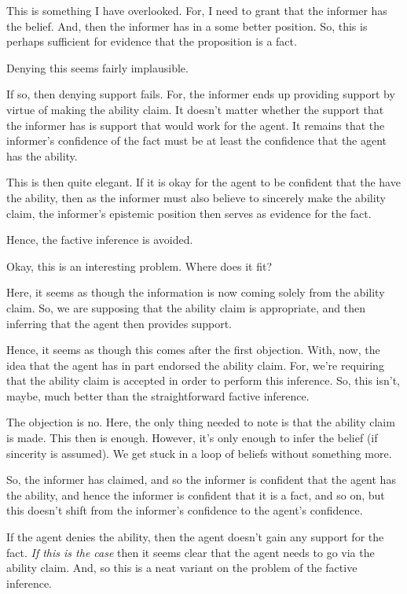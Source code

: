 \documentclass[10pt]{article}
\begin{document}
\begin{note}
  This is something I have overlooked.
  For, I need to grant that the informer has the belief.
  And, then the informer has in a some better position.
  So, this is perhaps sufficient for evidence that the proposition is a fact.

  Denying this seems fairly implausible.

  If so, then denying support fails.
  For, the informer ends up providing support by virtue of making the ability claim.
  It doesn't matter whether the support that the informer has is support that would work for the agent.
  It remains that the informer's confidence of the fact must be at least the confidence that the agent has the ability.

  This is then quite elegant.
  If it is okay for the agent to be confident that the have the ability, then as the informer must also believe to sincerely make the ability claim, the informer's epistemic position then serves as evidence for the fact.

  Hence, the factive inference is avoided.

  Okay, this is an interesting problem.
  Where does it fit?

  Here, it seems as though the information is now coming solely from the ability claim.
  So, we are supposing that the ability claim is appropriate, and then inferring that the agent then provides support.

  Hence, it seems as though this comes after the first objection.
  With, now, the idea that the agent has in part endorsed the ability claim.
  For, we're requiring that the ability claim is accepted in order to perform this inference.
  So, this isn't, maybe, much better than the straightforward factive inference.

  The objection is no.
  Here, the only thing needed to note is that the ability claim is made.
  This then is enough.
  However, it's only enough to infer the belief (if sincerity is assumed).
  We get stuck in a loop of beliefs without something more.

  So, the informer has claimed, and so the informer is confident that the agent has the ability, and hence the informer is confident that it is a fact, and so on, but this doesn't shift from the informer's confidence to the agent's confidence.

  If the agent denies the ability, then the agent doesn't gain any support for the fact.
  \emph{If this is the case} then it seems clear that the agent needs to go via the ability claim.
  And, so this is a neat variant on the problem of the factive inference.
\end{note}
\end{document}
